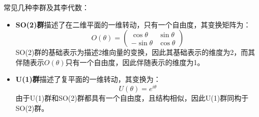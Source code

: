 常见几种李群及其李代数：
\begin{itemize}
    \item \textbf{SO(2)群}描述了在二维平面的一维转动，只有一个自由度，其变换矩阵为：
    \begin{equation}
        O(\theta) = \begin{pmatrix}
            \cos\theta& \sin\theta\\
            -\sin\theta& \cos\theta
        \end{pmatrix}
    \end{equation}
    SO(2)群的基础表示为描述2维向量的变换，因此其基础表示的维度为2，而其伴随表示$O(\theta)$只有一个自由度，因此伴随表示的维度为1。
\item \textbf{U(1)群}描述了复平面的一维转动，其变换为：
    \begin{equation}
        U(\theta) = e^{i\theta}
    \end{equation}
    由于U(1)群和SO(2)群都具有一个自由度，且结构相似，因此U(1)群同构于SO(2)群。
    

\end{itemize}
